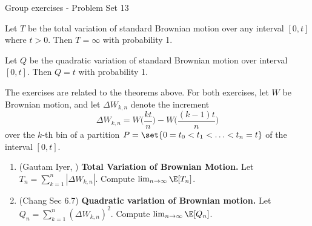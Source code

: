 \documentclass[10pt]{beamer}
\begin{document}
\begin{frame}{Group exercises - Problem Set 13}
\footnotesize 

\begin{mygreenbox}[title=Theorem (Gautam Iyer)]
Let $T$ be the total variation of standard Brownian motion over any interval $[0,t]$ where $t>0$. Then $T=\infty$ with probability 1. 
\end{mygreenbox}

\begin{mygreenbox}[title=Theorem (Chang 6.7)]
Let $Q$ be the quadratic variation of standard Brownian motion over interval $[0,t]$. Then $Q=t$ with probability 1. 
\end{mygreenbox}

The exercises are related to the theorems above. For both exercises, let $W$ be Brownian motion, and let $\Delta W_{k,n}$ denote the increment 
	\[ \Delta W_{k,n} = W \bigg( \frac{kt}{n} \bigg) -  W \bigg( \frac{(k-1)t}{n} \bigg)\] 
	over the $k$-th bin of a partition $P = \set{0 = t_0 < t_1 < \hdots < t_n = t}$ of the interval $[0,t]$. 


\begin{enumerate}
	\item (Gautam Iyer, \textit{\href{https://www.math.cmu.edu/~gautam/sj/teaching/2021-22/944-scalc-finance1/pdfs/ch3-int.pdf}{\underline{}}}) \textbf{Total Variation of Brownian Motion.}   Let $T_n = \sum_{k=1}^{n} |\Delta W_{k,n}|$.  Compute $\lim_{n \to \infty} \E[T_n]$.  
	\item (Chang Sec 6.7) \textbf{Quadratic variation of Brownian motion.} Let $Q_n = \sum_{k=1}^{n} (\Delta W_{k,n})^2$.  Compute $\lim_{n \to \infty} \E[Q_n]$.

\end{enumerate}




\end{frame}
\end{document}
